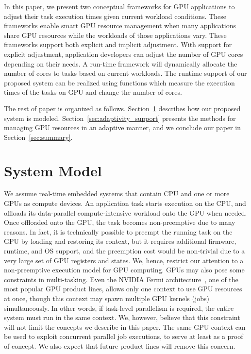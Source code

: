 \documentclass{acm_proc_article-sp}
\begin{document}
In this paper, we present two conceptual frameworks for
GPU applications to adjust their task execution times 
given current workload conditions. These frameworks enable
smart GPU resource management when many applications
share GPU resources while the workloads of those applications vary. 
These frameworks support both explicit and implicit adjustment. 
With support for explicit adjustment, %
application developers can adjust the number
of GPU cores depending on their needs. %
A run-time framework will dynamically
allocate the number of cores to tasks based on current 
workloads. The runtime support of our proposed system
can be realized using functions which measure the execution 
times of the tasks on GPU and change the number of cores.

The rest of paper is organized as
follows. Section~\ref{sec:system_model} describes how our proposed
system is modeled. Section~\ref{sec:adaptivity_support} presents the
methods for managing GPU resources in an adaptive manner, and we conclude our paper in Section~\ref{sec:summary}.

\section{System Model}
\label{sec:system_model}

We assume real-time embedded systems that contain CPU and one or more GPUs as compute devices.
An application task starts execution on the CPU, and offloads its
data-parallel compute-intensive workload onto the GPU when needed.
Once offloaded onto the GPU, the task becomes non-preemptive due to many
reasons.
In fact, it is technically possible to preempt the running task on the
GPU by loading and restoring its context, but it requires additional
firmware, runtime, and OS support, and the preemption cost would be
non-trivial due to a very large set of GPU registers and states.
We, hence, restrict our attention to a non-preemptive execution model for
GPU computing.
GPUs may also pose some constraints in multi-tasking.
Even the NVIDIA Fermi architecture~\cite{Fermi}, one of the most popular
GPU product lines, allows only one context to use GPU resources at
once, though this context may spawn multiple GPU kernels (jobs)
simultaneously.
In other words, if task-level parallelism is required, the entire system
must run in the same context.
We, however, believe that this constraint will not limit the 
concepts we describe in this paper.
The same GPU context can be used to exploit concurrent parallel job
executions, to serve at least as a proof of concept. 
We also expect that future product lines will remove this concern.
\end{document}
